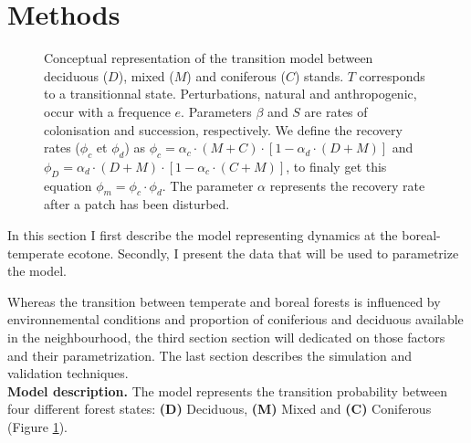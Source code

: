 \section{Methods}   

\begin{figure}
	
	\caption{Conceptual representation of the transition model between deciduous ($D$),
	mixed ($M$) and coniferous ($C$) stands. $T$ corresponds to a transitionnal state.
	Perturbations, natural and anthropogenic, occur with a frequence $e$. Parameters $\beta$
	and $S$ are rates of colonisation and succession,
	respectively. We define the recovery rates ($\phi_c$ et $\phi_d$) as $\phi_c
	= \alpha_c \cdot (M+C) \cdot [1- \alpha_d \cdot (D +M)]$ and $\phi_D =
	\alpha_d \cdot (D+M) \cdot [1- \alpha_c \cdot (C +M)]$, to finaly get this
	equation $\phi_m = \phi_c \cdot \phi_d$. The parameter $\alpha$ represents the
	recovery rate after a patch has been disturbed.}
	\label{Model}
\end{figure}

In this section I first describe the model representing dynamics at the
boreal-temperate ecotone. Secondly, I present the  data that will be used to
parametrize the model.


Whereas the transition between temperate and boreal forests is influenced by
environnemental conditions and proportion of coniferious and deciduous
available in the neighbourhood, the third section section will dedicated on
those factors and their parametrization. The last section describes the
simulation and validation techniques.\\




\textbf{Model description.} The model represents the transition probability
between four different forest states: \textbf{(D)} Deciduous, \textbf{(M)}
Mixed and \textbf{(C)} Coniferous (Figure \ref{Model}).

